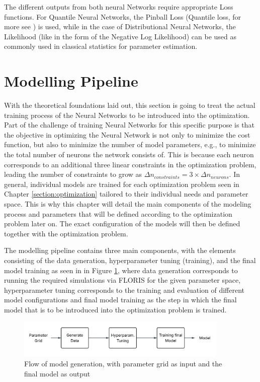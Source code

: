 The different outputs from both neural Networks require appropriate Loss functions. For Quantile Neural Networks, the Pinball Loss (Quantile loss, for more see \cite{Steinwart_2011}) is used, while in the case of Distributional Neural Networks, the Likelihood (like in the form of the Negative Log Likelihood)  can be used as commonly used in classical statistics for parameter estimation. 

\cite{Akpabio} \cite{Marcjasz_2023}

\section{Modelling Pipeline} \label{sec:model_pipe}

With the theoretical foundations laid out, this section is going to treat the actual training process of the Neural Networks to be introduced into the optimization. Part of the challenge of training Neural Networks for this specific purpose is that the objective in optimizing the Neural Network is not only to minimize the cost function, but also to minimize the  number of model parameters, e.g., to minimize the total number of neurons the network consists of. This is because each neuron corresponds to an additional three linear constraints in the optimization problem, leading the number of constraints to grow as $\Delta n_{constraints} =3 \times \Delta n_{neurons}$. In general, individual models are trained for each optimization problem seen in Chapter \ref{section:optimization} tailored to their individual needs and parameter space. This is why this chapter will detail the main components of the modeling process and parameters that will be defined according to the optimization problem later on. The exact configuration of the models will then be defined together with the optimization problem.  

The modelling pipeline contains three main components, with the elements consisting of the data generation, hyperparameter tuning (training), and the final model training as seen in in Figure \ref{fig:model_flow}, where data generation corresponds to running the required simulations via FLORIS  for the given parameter space, hyperparameter tuning corresponds to the training and evaluation of different model configurations and final model training as the step in which the final model that is to be introduced into the optimization problem is trained.


\begin{figure}[h] 
	\centering
	\includegraphics[width=0.9\textwidth]{figures/modelling/model_flow.png} 
	\caption{Flow of model generation, with parameter grid as input and the final model as output}
	\label{fig:model_flow}
\end{figure}

